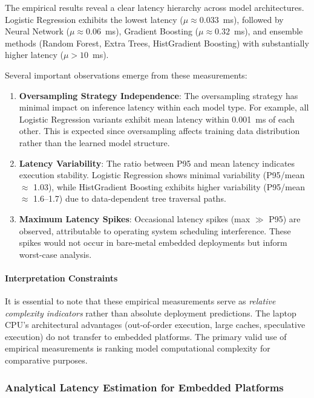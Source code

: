 The empirical results reveal a clear latency hierarchy across model architectures. Logistic Regression exhibits the lowest latency ($\mu \approx 0.033$~ms), followed by Neural Network ($\mu \approx 0.06$~ms), Gradient Boosting ($\mu \approx 0.32$~ms), and ensemble methods (Random Forest, Extra Trees, HistGradient Boosting) with substantially higher latency ($\mu > 10$~ms). 

Several important observations emerge from these measurements:

\begin{enumerate}
    \item \textbf{Oversampling Strategy Independence}: The oversampling strategy has minimal impact on inference latency within each model type. For example, all Logistic Regression variants exhibit mean latency within 0.001~ms of each other. This is expected since oversampling affects training data distribution rather than the learned model structure.
    
    \item \textbf{Latency Variability}: The ratio between P95 and mean latency indicates execution stability. Logistic Regression shows minimal variability (P95/mean $\approx$ 1.03), while HistGradient Boosting exhibits higher variability (P95/mean $\approx$ 1.6--1.7) due to data-dependent tree traversal paths.
    
    \item \textbf{Maximum Latency Spikes}: Occasional latency spikes (max $\gg$ P95) are observed, attributable to operating system scheduling interference. These spikes would not occur in bare-metal embedded deployments but inform worst-case analysis.
\end{enumerate}

\paragraph{Interpretation Constraints}
It is essential to note that these empirical measurements serve as \textit{relative complexity indicators} rather than absolute deployment predictions. The laptop CPU's architectural advantages (out-of-order execution, large caches, speculative execution) do not transfer to embedded platforms. The primary valid use of empirical measurements is ranking model computational complexity for comparative purposes.

\subsubsection{Analytical Latency Estimation for Embedded Platforms}

